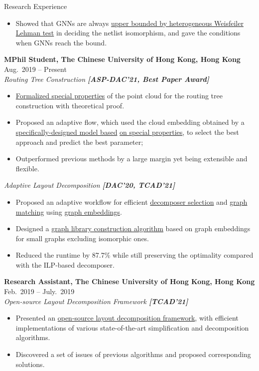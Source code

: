 \begin{rSection}{Research Experience}
\begin{itemize}[noitemsep,topsep=-5pt]
    changes that stem from a logic lock as the ability to {decide
    the isomorphism between logic netlists.}
    \item Showed that GNNs
    are always \underline{upper bounded by heterogeneous Weisfeiler Lehman
    test} in deciding the netlist isomorphism, and gave the conditions
    when GNNs reach the bound.
\end{itemize}
{\bf MPhil Student, The Chinese University of Hong Kong, Hong Kong}               \hfill { Aug.~2019 -- Present} \\
\textit{Routing Tree Construction \textbf{[{ASP-DAC'21, Best Paper Award}]}}
\begin{itemize}[noitemsep,topsep=-5pt]
    \item \underline{Formalized special properties} of the point cloud for the routing tree construction with theoretical proof.
    \item Proposed an adaptive flow, which used the cloud embedding obtained by a \underline{specifically-designed model based} \underline{on special properties}, to select the best approach and predict the best parameter;
    \item Outperformed previous methods by a large margin yet being extensible and flexible.
\end{itemize}
\textit{Adaptive Layout Decomposition \textbf{[{DAC'20, TCAD'21}]}}
\begin{itemize}[noitemsep,topsep=-5pt]
    \item Proposed an adaptive workflow for efficient \underline{decomposer selection} and \underline{graph matching} using \underline{graph embeddings}.
    \item Designed a \underline{graph library construction algorithm} based on graph embeddings for small graphs excluding isomorphic ones.
    \item Reduced the runtime by 87.7\% while still preserving the optimality compared with the ILP-based decomposer.
\end{itemize}
{\bf Research Assistant, The Chinese University of Hong Kong, Hong Kong}               \hfill { Feb.~2019 -- July.~2019} \\
\textit{Open-source Layout Decomposition Framework \textbf{[{TCAD'21}]}}
\begin{itemize}[noitemsep,topsep=-5pt]
    \item Presented an \underline{open-source layout decomposition framework}, with efficient implementations of various state-of-the-art simplification and decomposition algorithms.
    \item Discovered a set of issues of previous algorithms and proposed corresponding solutions. \\
\end{itemize}


\end{rSection}
